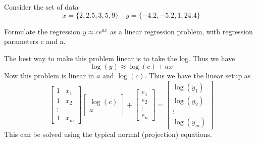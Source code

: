 \documentclass{homework}
\begin{document}
\begin{problem}[3-3]
  Consider the set of data
  \[ x = \{2,2.5,3,5,9\} \quad y = \{-4.2,-5.2,1,24.4\} \]
\end{problem}

\begin{problem}
  Formulate the regression $y \approx ce^{ax}$ as a linear regression problem, with regression parameters c and a. 
\end{problem}

\begin{solution}
  The best way to make this problem linear is to take the log. Thus we have
  \[\log(y) \approx \log(c) + ax\]
  Now this problem is linear in $a$ and $\log(c)$.
  Thus we have the linear setup as
  $$
  \begin{bmatrix}
    1 & x_1 \\
    1 & x_2 \\
    \vdots \\
    1 & x_m
  \end{bmatrix}
  \begin{bmatrix}
    \log(c) \\
    a 
  \end{bmatrix}
  +
  \begin{bmatrix}
   e_1 \\
   e_2 \\
   \vdots \\
   e_n
  \end{bmatrix}
  =
  \begin{bmatrix}
    \log(y_1) \\
    \log(y_2) \\
    \vdots \\
    \log(y_m)
  \end{bmatrix}
  $$
  This can be solved using the typical normal (projection) equations.
\end{solution}
\end{document}
